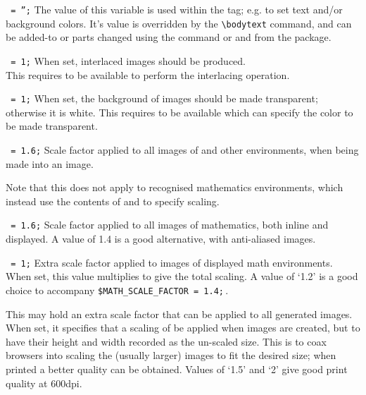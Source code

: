 \begin{htmllist}
\item [\fn{\$BODYTEXT}\texttt{ = '';}]
The value of this variable is used within the  tag;
e.g. to set text and/or background colors.\html{\\}
It's value is overridden by the \verb|\bodytext| command, 
and can be added-to or parts changed using the  command
or  and  from the  package.


\item [\fn{\$INTERLACE}\texttt{ = 1;}\label{interlace}]
When set, interlaced images should be produced.\\
This requires  to be available 
to perform the interlacing operation.


\item [\fn{\$TRANSPARENT\_FIGURES}\texttt{ = 1;}\label{transfigs}]
When set, the background of images should be made transparent;
otherwise it is white.\html{\\}
This requires  %
to be available which can specify the color to be made transparent.


\item [\fn{\$FIGURE\_SCALE\_FACTOR}\texttt{ = 1.6;}\label{figscale}]
Scale factor applied to all images of  and other environments, 
when being made into an image.

\smallskip\noindent
Note that this does not apply to recognised mathematics environments, 
which instead use the contents of  
and  to specify scaling.


\item [\fn{\$MATH\_SCALE\_FACTOR}\texttt{ = 1.6;}\label{mathscale}]
Scale factor applied to all images of mathematics, both inline
and displayed. 
A value of 1.4 is a good alternative, with anti-aliased images.


\item [\fn{\$DISP\_SCALE\_FACTOR}\texttt{ = 1;}\label{dispscale}]
Extra scale factor applied to images of displayed math environments.\html{\\}
When set, this value multiplies 
to give the total scaling. 
A value of `1.2' is a good choice to accompany \verb|$MATH_SCALE_FACTOR = 1.4;|\,.


\item [\fn{\$EXTRA\_IMAGE\_SCALE}\label{ximagescale}]
This may hold an extra scale factor that can be applied to all generated images.\html{\\}
When set, it specifies that a scaling of  be applied 
when images are created, but to have their height and width recorded 
as the un-scaled size. This is to coax browsers into scaling the (usually larger) 
images to fit the desired size; when printed a better quality can be obtained.
Values of `1.5' and `2' give good print quality at 600dpi.



\end{htmllist}
